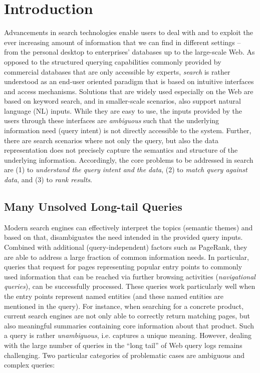 \section{Introduction}
Advancements in search technologies enable users to deal with and to exploit the ever increasing amount of information that we can find in different settings -- from the personal desktop to enterprises' databases up to the large-scale Web. As opposed to the structured querying capabilities commonly provided by commercial databases that are only accessible by experts, \emph{search} is rather understood as an end-user oriented paradigm that is based on intuitive interfaces and access mechanisms. Solutions that are widely used especially on the Web are based on keyword search, and in smaller-scale scenarios, also support natural language (NL) inputs. While they are easy to use, the inputs provided by the users through these interfaces are \emph{ambiguous} such that the underlying information need (query intent) is not directly accessible to the system. Further, there are search scenarios where not only the query, but also the data representation does not precisely capture the semantics and structure of the underlying information. Accordingly, the core problems to be addressed in search are (1) to \emph{understand the query intent and the data}, (2) to \emph{match query against data}, and (3) to \emph{rank results}. 

\subsection{Many Unsolved Long-tail Queries}
Modern search engines can effectively interpret the topics (semantic themes) and based on that, disambiguates the need intended in the provided query inputs. Combined with additional (query-independent) factors such as PageRank, they are able to address a large fraction of common information needs. In particular, queries that request for pages 
representing popular entry points to commonly used information that can be reached via further browsing activities (\emph{navigational queries}), can be successfully processed. These queries work particularly well when the entry points represent named entities (and these named entities are mentioned in the query). For instance, when searching for a concrete product, current search engines are not only able to correctly return matching pages, but also meaningful summaries containing core information about that product. Such a query is rather \emph{unambiguous}, i.e. captures a unique meaning. However, dealing with the large number of queries in the ``long tail'' of Web query logs \cite{} remains challenging. Two particular categories of problematic cases are ambiguous and complex queries:

